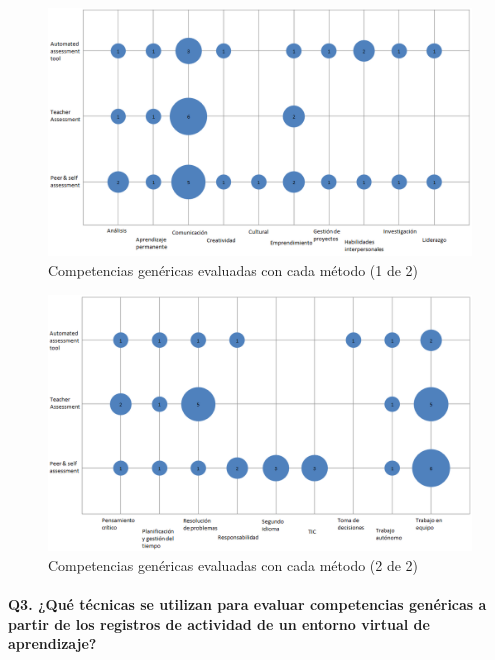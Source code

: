 \begin{landscape}
\pagestyle{empty}
\begin{figure}[h]
  \begin{center}
    \includegraphics[scale=0.6]{BurbujaCompetenciasCut1.png}
  \end{center}
  \caption{Competencias genéricas evaluadas con cada método (1 de 2)}
  \label{fig:competencias1}
\end{figure}

\begin{figure}[h]
  \begin{center}
    \includegraphics[scale=0.6]{BurbujaCompetenciasCut2.png}
  \end{center}
  \caption{Competencias genéricas evaluadas con cada método (2 de 2)}
  \label{fig:competencias2}
\end{figure}

\end{landscape}
\pagestyle{fancy}

\paragraph*{Q3. ¿Qué técnicas se utilizan para evaluar competencias genéricas a partir de los registros de actividad de un entorno virtual de aprendizaje?}

